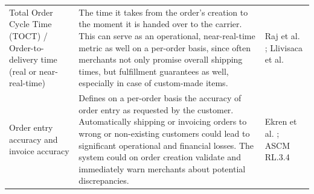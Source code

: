 \documentclass{imc-inf}
\begin{document}
\begin{table}[!htbp]
\begin{tabular}{@{}>{\raggedright\arraybackslash}p{4cm}p{8cm}>{\raggedright\arraybackslash}p{3cm}@{}}
    Total Order Cycle Time (TOCT) / Order-to-delivery time (real or near-real-time)                                                                                                                                                                                                                                                            &
    The time it takes from the order's creation to the moment it is handed over to the carrier. This can serve as an operational, near-real-time metric as well on a per-order basis, since often merchants not only promise overall shipping times, but fulfillment guarantees as well, especially in case of custom-made items.              &
    Raj et al. \cite{rajStochasticModelingIntegrated2024}; Llivisaca et al. \cite{llivisaca2020key}                                                                                                                                                                                                                                                                                     \\[6pt]

    Order entry accuracy and invoice accuracy                                                                                                                                                                                                                                                                                                  &
    Defines on a per-order basis the accuracy of order entry as requested by the customer. Automatically shipping or invoicing orders to wrong or non-existing customers could lead to significant operational and financial losses. The system could on order creation validate and immediately warn merchants about potential discrepancies. &
    Ekren et al. \cite{ekrenEnhancingEgroceryOrder2025}; ASCM RL.3.4 \cite{ascm2022scor}                                                                                                                                                                                                                                                                                                \\[6pt]


\end{tabular}
\end{table}
\end{document}
